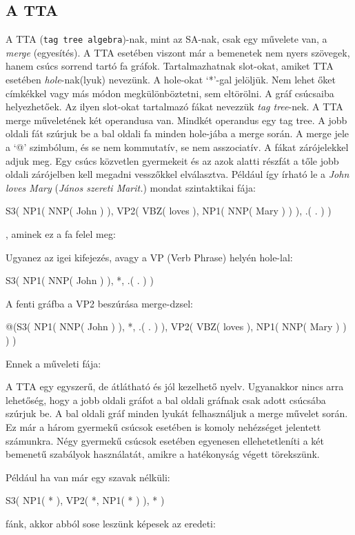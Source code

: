\subsection{A TTA}
A TTA (\texttt{tag tree algebra})-nak, mint az SA-nak, csak egy művelete van, a \textit{merge} (egyesítés). A TTA esetében viszont  már a bemenetek nem nyers szövegek, hanem csúcs sorrend tartó fa gráfok. Tartalmazhatnak slot-okat, amiket TTA esetében \textit{hole}-nak(lyuk) nevezünk. A hole-okat ‘*’-gal jelöljük. Nem lehet őket címkékkel vagy más módon megkülönböztetni, sem eltörölni. A gráf csúcsaiba helyezhetőek. Az ilyen slot-okat tartalmazó fákat nevezzük \textit{tag tree}-nek. A TTA merge műveletének két operandusa van. Mindkét operandus egy tag tree. A jobb oldali fát szúrjuk be a bal oldali fa minden hole-jába a merge során. A merge jele a ‘@’ szimbólum, és se nem kommutatív, se nem asszociatív. A fákat zárójelekkel adjuk meg. Egy csúcs közvetlen gyermekeit és az azok alatti részfát a tőle jobb oldali zárójelben kell megadni vesszőkkel elválasztva. Például így írható le a \textit{John loves Mary} (\textit{János szereti Marit.}) mondat szintaktikai fája:

S3( NP1( NNP( John ) ), VP2( VBZ( loves ),  NP1( NNP( Mary ) ) ), .( . ) )

, aminek ez a fa felel meg:

Ugyanez az igei kifejezés, avagy a VP (Verb Phrase) helyén hole-lal:

S3( NP1( NNP( John ) ), *, .( . ) )

A fenti gráfba a VP2 beszúrása merge-dzsel:

@(S3( NP1( NNP( John ) ), *, .( . ) ),  VP2( VBZ( loves ), NP1( NNP( Mary ) ) ) )

Ennek a műveleti fája:

A TTA egy egyszerű, de átlátható és jól kezelhető nyelv. Ugyanakkor nincs arra lehetőség, hogy a jobb oldali gráfot a bal oldali gráfnak csak adott csúcsába szúrjuk be. A bal oldali gráf minden lyukát felhasználjuk a merge művelet során. Ez már a három gyermekű csúcsok esetében is komoly nehézséget jelentett számunkra. Négy gyermekű csúcsok esetében egyenesen ellehetetleníti a két bemenetű szabályok használatát, amikre a hatékonyság végett törekszünk.

Például ha van már egy szavak nélküli:

S3( NP1( * ), VP2( *,  NP1( * ) ), * )

fánk, akkor abból sose leszünk képesek az eredeti:

